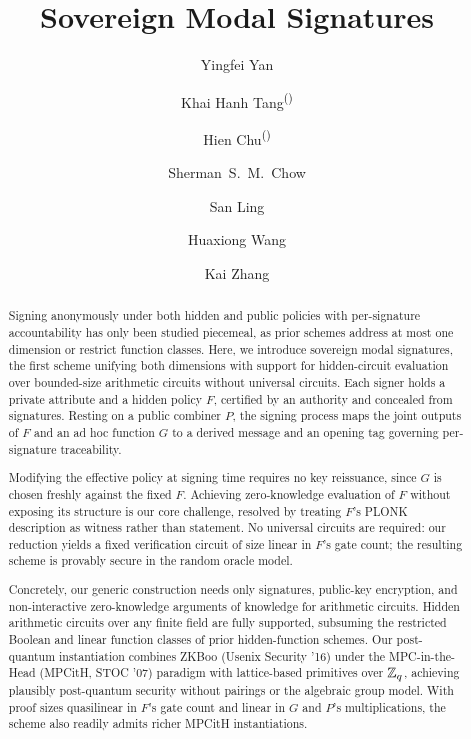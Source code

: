 \documentclass[runningheads]{llncs}
\title{Sovereign Modal Signatures}
\author{
	Yingfei Yan\inst{1}\orcidlink{0000-0002-9415-7935}%
	\and Khai Hanh Tang\inst{2}\orcidlink{0009-0009-6790-4577}\textsuperscript{(\Letter)}
	\and Hien Chu\inst{3,4}\orcidlink{0000-0002-2370-7864}\textsuperscript{(\Letter)}
	\and Sherman~S.~M.~Chow\inst{5}\orcidlink{0000-0001-7306-453X}
	\and San Ling\inst{2}\orcidlink{0000-0002-1978-3557}
	\and Huaxiong Wang\inst{2}\orcidlink{0000-0002-7669-8922}
	\and Kai Zhang\inst{6}\orcidlink{0009-0007-5445-8454}
}
\institute{
	Université Clermont Auvergne, CNRS, LIMOS, France\\
	\and Nanyang Technological University, 50 Nanyang Ave, Singapore\\
	\and TU Wien, Vienna, Austria\\
	\and Friedrich-Alexander-Universität Erlangen-Nürnberg, Erlangen, Germany\\
	\and Dept. of Information Engineering, Chinese University of Hong Kong, 
	Hong Kong\\
	\and School of Mathematics and Statistics, Shaanxi Normal University, Xi'an,
	China\\
	\email{khaihanh.tang@ntu.edu.sg},
	\email{hien.chu@tuwien.ac.at}
}
\begin{document}


\maketitle
\begin{abstract}
Signing anonymously under both hidden and public policies with per-signature accountability has only been studied piecemeal, as prior schemes address at most one dimension or restrict function classes.
Here, we introduce sovereign modal signatures, the first scheme unifying both dimensions with support for hidden-circuit evaluation over bounded-size arithmetic circuits without universal circuits.
Each signer holds a private attribute and a hidden policy $F$, certified by an authority and concealed from signatures.
Resting on a public combiner $P$, the signing process maps the joint outputs of $F$ and an ad hoc function $G$ to a derived message and an opening tag governing per-signature traceability.

Modifying the effective policy at signing time requires no key reissuance, since $G$ is chosen freshly against the fixed $F$.
Achieving zero-knowledge evaluation of $F$ without exposing its structure is our core challenge, resolved by treating $F$'s PLONK description as witness rather than statement.
No universal circuits are required: our reduction yields a fixed verification circuit of size linear in $F$'s gate count; the resulting scheme is provably secure in the random oracle model.

Concretely, our generic construction needs only signatures, public-key encryption, and non-interactive zero-knowledge arguments of knowledge for arithmetic circuits.
Hidden arithmetic circuits over any finite field are fully supported, subsuming the restricted Boolean and linear function classes of prior hidden-function schemes.
Our post-quantum instantiation combines ZKBoo (Usenix Security '16) under the MPC-in-the-Head (MPCitH, STOC '07) paradigm with lattice-based primitives over $\mathbb{Z}_q$, achieving plausibly post-quantum security without pairings or the algebraic group model.
With proof sizes quasilinear in $F$'s gate count and linear in $G$ and $P$'s multiplications, the scheme also readily admits richer MPCitH instantiations.

\end{abstract}






\end{document}
